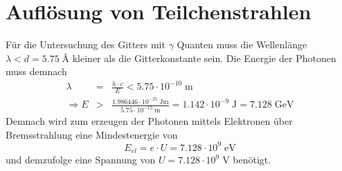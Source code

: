 \documentclass[12pt,DIV=15,a4paper,twoside,draft=false]{scrartcl}
\begin{document}
\section{Auflösung von Teilchenstrahlen}
Für die Untersuchung des Gitters mit $γ$ Quanten muss die Wellenlänge $λ < d = 5.75\;{}$\AA{} kleiner als die Gitterkonstante sein.
Die Energie der Photonen muss demnach
\begin{eqnarray*}
λ & = & \frac{h\cdot c}{E} < 5.75\cdot 10^{-10}\;\mathrm{m} \\
\Rightarrow E  & > & \frac{1.986446\cdot 10^{-25}\;\mathrm{J m}}{5.75\cdot 10^{-15}\;\mathrm{m}} = 1.142\cdot 10^{-9}\;\mathrm{J} = 7.128\;\mathrm{GeV}
\end{eqnarray*}
Demnach wird zum erzeugen der Photonen mittels Elektronen über Bremsstrahlung eine Mindestenergie von
$$ E_{el} = e\cdot U = 7.128\cdot 10^9\;\mathrm{eV}$$
und demzufolge eine Spannung von $U = 7.128\cdot 10^9\;\mathrm{V}$ benötigt.

\end{document}
